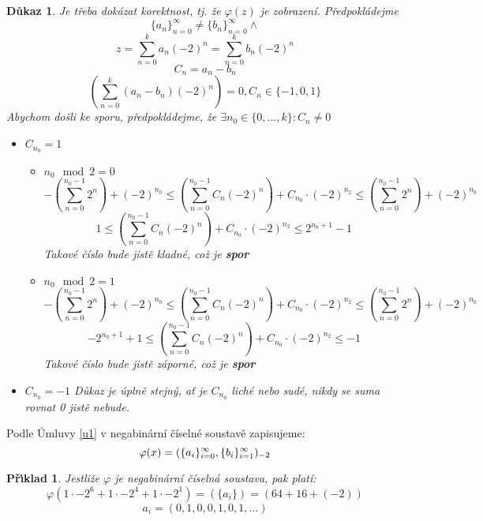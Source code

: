 \documentclass[12pt]{book}
\newtheorem{pr}{P\v r\'\i klad}
\newtheorem{dukaz}{Důkaz}
\begin{document}
\newpage
\begin{dukaz}
	Je třeba dokázat korektnost, tj. že $\varphi(z)$ je zobrazení.
	Předpokládejme $$\{a_n\}_{n=0}^\infty \ne \{b_n\}_{n=0}^\infty \land$$ $$z=\sum_{n=0}^{k}a_n(-2)^n = \sum_{n=0}^{k}b_n(-2)^n$$
	$$C_n = a_n - b_n$$
	$$\left(\sum_{n=0}^k(a_n-b_n)(-2)^n\right) = 0 , C_n \in \{-1, 0 ,1\}$$
	Abychom došli ke sporu, předpokládejme, že $\exists n_0 \in \{0,...,k\}: C_n \ne 0$
	\begin{itemize}
		\item[$\alpha)$]$C_{n_0} = 1$
		\begin{itemize}
			\item[I.)] $n_0 \mod2 = 0$
			$$-\left(\sum_{n=0}^{n_0-1}2^n\right)+(-2)^{n_0}\leq \left(\sum_{n=0}^{n_0-1}C_n(-2)^n\right)+C_{n_0}\cdot(-2)^{n_2}  \leq\left(\sum_{n=0}^{n_0-1}2^n\right)+(-2)^{n_0}$$
			$$1\leq \left(\sum_{n=0}^{n_0-1}C_n(-2)^n\right)+C_{n_0}\cdot(-2)^{n_2}  \leq 2^{n_0 + 1}-1$$
			Takové číslo bude jistě kladné, což je \textbf{spor}
			\item[II.)] $n_0 \mod2 = 1$
			$$-\left(\sum_{n=0}^{n_0-1}2^n\right)+(-2)^{n_0}\leq \left(\sum_{n=0}^{n_0-1}C_n(-2)^n\right)+C_{n_0}\cdot(-2)^{n_2}  \leq\left(\sum_{n=0}^{n_0-1}2^n\right)+(-2)^{n_0}$$
			$$-2^{n_0+1}+1\leq \left(\sum_{n=0}^{n_0-1}C_n(-2)^n\right)+C_{n_0}\cdot(-2)^{n_2}  \leq -1$$
			Takové číslo bude jistě záporné, což je \textbf{spor}
			
		\end{itemize}
		\item[$\beta)$]$C_{n_0} = -1$\newline
		Důkaz je úplně stejný, ať je $C_{n_0}$ liché nebo sudé, nikdy se suma rovnat 0 jistě nebude.
	\end{itemize}
\end{dukaz}
	\newpage
	Podle Úmluvy \ref{u1} v negabinární číselné soustavě zapisujeme:
	$$\varphi(x) = (\{a_i\}_{i=0}^{\infty},\{b_i\}_{i=1}^{\infty})_{-2}$$


\begin{pr}
	Jestliže $\varphi$ je negabinární číselná soustava, pak platí:
	$$\varphi(1\cdot-2^6+1\cdot-2^4+1\cdot-2^1)=(\{a_i\})=(64+16+(-2))$$
	$${a_i}=(0,1,0,0,1,0,1,...) $$
\end{pr}


\newpage
\end{document}
